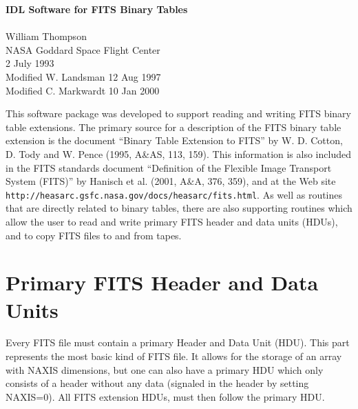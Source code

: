 
\setlength{\oddsidemargin}{0in}		%
\setlength{\topmargin}{-0.5in}		%
\setlength{\textwidth}{6.5in}		%
\setlength{\textheight}{9in}		%

\addtolength{\parskip}{0.5\baselineskip}

\thispagestyle{empty}			%

\begin{center}
{\Large\bf IDL Software for FITS Binary Tables}\\
\mbox{}\\
William Thompson\\
NASA Goddard Space Flight Center\\
2 July 1993\\
Modified W. Landsman 12 Aug 1997 \\
Modified C. Markwardt 10 Jan 2000
\end{center}

This software package was developed to support reading and writing FITS binary
table extensions.  The primary source for a description of the FITS binary
table extension is the document ``Binary Table Extension to FITS''
by W. D.  Cotton, D. Tody and W. Pence (1995, A\&AS, 113, 159).  This
information is also included  in the FITS standards document
``Definition of the Flexible Image Transport System (FITS)'' by Hanisch et al.
(2001, A\&A, 376, 359), and at the Web site \\
{\tt http://heasarc.gsfc.nasa.gov/docs/heasarc/fits.html}.  As well as routines
that are directly related to binary tables, there are also supporting routines
which allow the user to read and write primary FITS header and data units
(HDUs), and to copy FITS files to and from tapes.

\section{Primary FITS Header and Data Units}

Every FITS file must contain a primary Header and Data Unit (HDU).  This part
represents the most basic kind of FITS file.  It allows for the storage of an
array with NAXIS dimensions, but one can also have a primary HDU which only
consists of a header without any data (signaled in the header by setting
NAXIS=0).  All FITS extension HDUs, must then follow the primary HDU.

